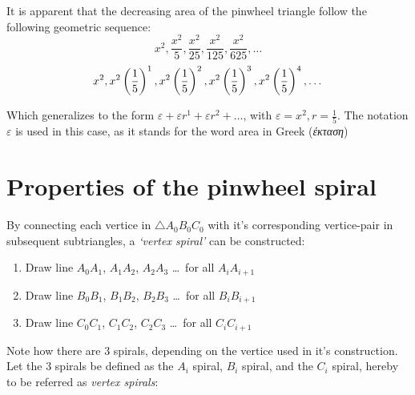 \noindent
It is apparent that the decreasing area of the pinwheel triangle follow the following geometric sequence:
\begin{equation}
    x^2, \frac{x^2}{5}, \frac{x^2}{25}, \frac{x^2}{125}, \frac{x^2}{625}, \ldots
\end{equation}
\begin{equation}
    x^2, x^2\left(\frac{1}{5}\right)^1, x^2\left(\frac{1}{5}\right)^2, x^2\left(\frac{1}{5}\right)^3, x^2\left(\frac{1}{5}\right)^4, \ldots \\
\end{equation}

\noindent
Which generalizes to the form $\varepsilon + \varepsilon r^1 + \varepsilon r^2 + \ldots$, with $\varepsilon = x^2, r = \frac{1}{5}$. The notation $\varepsilon$ is used in this case, as it stands for the word area in Greek (\emph{έκταση})

\newpage
\section{Properties of the pinwheel spiral}
By connecting each vertice in $\triangle A_{0}B_{0}C_{0}$ with it's corresponding vertice-pair in subsequent subtriangles, a \emph{`vertex spiral'} can be constructed:

\begin{enumerate}
    \item Draw line $A_{0}A_{1}$, $A_{1}A_{2}$, $A_{2}A_{3}$ \ldots\ for all $A_{i}A_{i + 1}$
    \item Draw line $B_{0}B_{1}$, $B_{1}B_{2}$, $B_{2}B_{3}$ \ldots\ for all $B_{i}B_{i + 1}$
    \item Draw line $C_{0}C_{1}$, $C_{1}C_{2}$, $C_{2}C_{3}$ \ldots\ for all $C_{i}C_{i + 1}$
\end{enumerate}



\noindent
Note how there are 3 spirals, depending on the vertice used in it's construction. Let the 3 spirals be defined as the $A_{i}$ spiral, $B_{i}$ spiral, and the $C_{i}$ spiral, hereby to be referred as \emph{vertex spirals}:







\newpage
